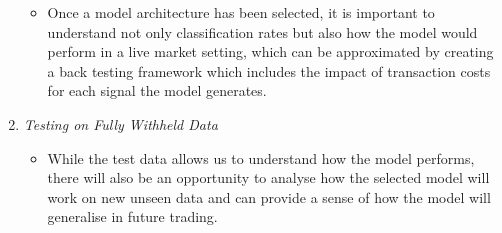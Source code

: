\documentclass[12pt, a4paper]{article}
\begin{document}
\begin{enumerate}
\begin{itemize}
	\item Once a model architecture has been selected, it is important to understand not only classification rates but also how the model would perform in a live market setting, which can be approximated by creating a back testing framework which includes the impact of transaction costs for each signal the model generates.
	\end{itemize}
  \item \textit{Testing on Fully Withheld Data}
	\begin{itemize}
	\item While the test data allows us to understand how the model performs, there will also be an opportunity to analyse how the selected model will work on new unseen data and can provide a sense of how the model will generalise in future trading.
	\end{itemize}
\end{enumerate}
\end{document}
